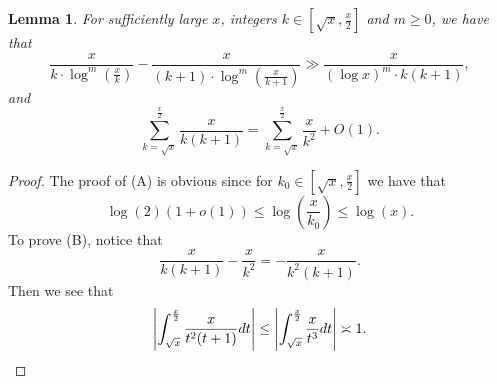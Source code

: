 \documentclass[11pt,reqno,a4letter]{article}
\numberwithin{figure}{section}
\numberwithin{table}{section}
\theoremstyle{plain}
\newtheorem{lemma}[theorem]{Lemma}
\numberwithin{theorem}{section}
\theoremstyle{definition}
\begin{document}
\begin{lemma}
\label{lemma_PrimePix_ErrorBoundDiffs_SimplifyingConditions_v1} 
For sufficiently large $x$, integers $k \in \left[\sqrt{x}, \frac{x}{2}\right]$ and 
$m \geq 0$, we have that 
\begin{equation} 
\tag{A} 
\frac{x}{k \cdot \log^m\left(\frac{x}{k}\right)} - 
     \frac{x}{(k+1) \cdot \log^m\left(\frac{x}{k+1}\right)}
     \gg \frac{x}{(\log x)^m \cdot k(k+1)}, 
\end{equation} 
and 
\begin{equation} 
\tag{B} 
\sum_{k=\sqrt{x}}^{\frac{x}{2}} \frac{x}{k(k+1)} = 
     \sum_{k=\sqrt{x}}^{\frac{x}{2}} \frac{x}{k^2} + O(1). 
\end{equation} 
\end{lemma} 
\begin{proof} 
The proof of (A) is obvious since for $k_0 \in \left[\sqrt{x}, \frac{x}{2}\right]$ we have that 
\[
\log(2) (1 + o(1)) \leq \log\left(\frac{x}{k_0}\right) \leq \log(x). 
\]
To prove (B), notice that 
\[
\frac{x}{k(k+1)} - \frac{x}{k^2} = -\frac{x}{k^2(k+1)}. 
\]
Then we see that 
\[
\left\lvert \int_{\sqrt{x}}^{\frac{x}{2}} \frac{x}{t^2(t+1)} dt \right\rvert \leq 
     \left\lvert \int_{\sqrt{x}}^{\frac{x}{2}} \frac{x}{t^3} dt \right\rvert \asymp 1. 
     \qedhere 
\]
\end{proof} 
\end{document}
